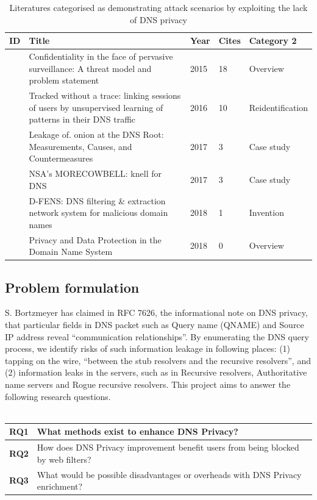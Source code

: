 \documentclass[a4paper,12pt]{article}
\begin{document}
\begin{table}[h!]
    \begin{tabular}{ | l | p{9cm} | l | l | l | }
        \hline
            ID & Title & Year & Cites & Category 2 \\ \hline
            \cite{barnes2015confidentiality} & Confidentiality in the face of pervasive surveillance: A threat model and problem statement & 2015 & 18 & Overview \\ \hline
            \cite{kirchler2016tracked} & Tracked without a trace: linking sessions of users by unsupervised learning of patterns in their DNS traffic & 2016 & 10 & Reidentification \\ \hline
            \cite{mohaisen2017leakage} & Leakage of. onion at the DNS Root: Measurements, Causes, and Countermeasures & 2017 & 3 & Case study \\ \hline
            \cite{grothoff2017nsa} & NSA's MORECOWBELL: knell for DNS & 2017 & 3 & Case study \\ \hline
            \cite{spaulding2018d} & D-FENS: DNS filtering \& extraction network system for malicious domain names & 2018 & 1 & Invention \\ \hline
            \cite{kelpen2018privacy} & Privacy and Data Protection in the Domain Name System & 2018 & 0 & Overview \\ \hline
        \end{tabular}
        \caption{Literatures categorised as demonstrating attack scenarios by exploiting the lack of DNS privacy}
\end{table}
\FloatBarrier
\subsection{Problem formulation}
S. Bortzmeyer has claimed in RFC 7626, the informational note on DNS privacy\cite{rfc7626}, that particular fields in DNS packet\cite{rfc1035} such as Query name  (QNAME) and Source IP address reveal ``communication relationships''. By enumerating the DNS query process, we identify risks of such information leakage in following places: (1) tapping on the wire, ``between the stub resolvers and the recursive resolvers'', and (2) information leaks in the servers, such as in Recursive resolvers, Authoritative name servers and Rogue recursive resolvers. This project aims to answer the following research questions.
\\\\
\begin{tabular} {|p{1.2cm}|p{11.6cm}|} \hline
  \textbf{RQ1} & What methods exist to enhance DNS Privacy? \\ \hline
  \textbf{RQ2} & How does DNS Privacy improvement benefit users from being blocked by web filters?\\ \hline
  \textbf{RQ3} & What would be possible disadvantages or overheads with DNS Privacy enrichment? \\ \hline
  \end{tabular}
\end{document}
